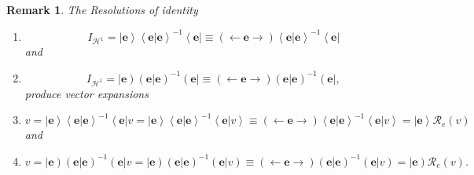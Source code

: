 \documentclass[aps,preprint]{revtex4}%
\newtheorem{remark}[theorem]{Remark}
\begin{document}
\begin{remark}
The Resolutions of identity

\begin{enumerate}
\item
\begin{equation}
I_{\mathcal{H}^{1}}=\left\vert \mathbf{e}\right\rangle \left\langle \left.
\mathbf{e}\right\vert \mathbf{e}\right\rangle ^{-1}\left\langle \mathbf{e}%
\right\vert \equiv\left(  \longleftarrow\mathbf{e\rightarrow}\right)
\left\langle \left.  \mathbf{e}\right\vert \mathbf{e}\right\rangle
^{-1}\left\langle \mathbf{e}\right\vert
\end{equation}
and

\item
\begin{equation}
I_{\mathcal{H}^{1}}=\left\vert \mathbf{e}\right)  \left(  \left.
\mathbf{e}\right\vert \mathbf{e}\right)  ^{-1}\left(  \mathbf{e}\right\vert
\equiv\left(  \longleftarrow\mathbf{e\rightarrow}\right)  \left(  \left.
\mathbf{e}\right\vert \mathbf{e}\right)  ^{-1}\left(  \mathbf{e}\right\vert ,
\end{equation}
produce vector expansions

\item
\begin{equation}
v=\left\vert \mathbf{e}\right\rangle \left\langle \left.  \mathbf{e}%
\right\vert \mathbf{e}\right\rangle ^{-1}\left\langle \mathbf{e}\right\vert
v=\left\vert \mathbf{e}\right\rangle \left\langle \left.  \mathbf{e}%
\right\vert \mathbf{e}\right\rangle ^{-1}\left\langle \left.  \mathbf{e}%
\right\vert v\right\rangle \equiv\left(  \longleftarrow\mathbf{e\rightarrow
}\right)  \left\langle \left.  \mathbf{e}\right\vert \mathbf{e}\right\rangle
^{-1}\left\langle \left.  \mathbf{e}\right\vert v\right\rangle =\left\vert
\mathbf{e}\right\rangle \mathcal{R}_{e}\left(  v\right)
\end{equation}
and

\item
\begin{equation}
v=\left\vert \mathbf{e}\right)  \left(  \left.  \mathbf{e}\right\vert
\mathbf{e}\right)  ^{-1}\left(  \mathbf{e}\right\vert v=\left\vert
\mathbf{e}\right)  \left(  \left.  \mathbf{e}\right\vert \mathbf{e}\right)
^{-1}\left(  \left.  \mathbf{e}\right\vert v\right)  \equiv\left(
\longleftarrow\mathbf{e\rightarrow}\right)  \left(  \left.  \mathbf{e}%
\right\vert \mathbf{e}\right)  ^{-1}\left(  \left.  \mathbf{e}\right\vert
v\right)  =\left\vert \mathbf{e}\right)  \mathcal{R}_{e}\left(  v\right)  .
\end{equation}

\end{enumerate}
\end{remark}
\end{document}

